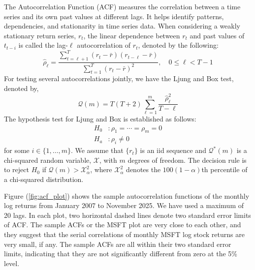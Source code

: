 \documentclass[12pt]{article}
\begin{document}
The Autocorrelation Function (ACF) measures the correlation between a time series and its own past values at different lags. It helps identify patterns, dependencies, and stationarity in time series data. When considering a weakly stationary return series, $r_t$, the linear dependence between $r_t$ and past values of $t_{t-i}$ is called the lag-$\ell$ autocorrelation of $r_t$, denoted by the following:
\begin{equation}
	\hat{\rho}_\ell=\frac{\sum_{t=\ell+1}^{T}\left(r_t-\bar{r}\right)\left(r_{t-\ell}-\bar{r}\right)}{\sum_{t=1}^{T}\left(r_t-\bar{r}\right)^2},\quad 0\leq\ell<T-1
\end{equation}
For testing several autocorrelations jointly, we have the Ljung and Box test, denoted by,
\begin{equation}
	\mathcal{Q}(m)=T(T+2)\sum_{\ell=1}^{m}\frac{\hat{\rho}_\ell^2}{T-\ell}
\end{equation}
The hypothesis test for Ljung and Box is established as follows:
\[
\begin{aligned}
	H_0&:\rho_1=\cdots=\rho_m=0\\
	H_a&:\rho_i\neq 0
\end{aligned}
\]
for some $i\in\lbrace1,\ldots,m\rbrace$. We assume that $\lbrace r_t\rbrace$ is an iid sequence and $\mathcal{Q}^*(m)$ is a chi-squared random variable, $\mathcal{X}$, with $m$ degrees of freedom. The decision rule is to reject $H_0$ if $\mathcal{Q}(m)>\mathcal{X}^2_\alpha$, where $\mathcal{X}^2_\alpha$ denotes the $100\left(1-\alpha\right)$th percentile of a chi-squared distribution. 

Figure (\ref{fig:acf_plot}) shows the sample autocorrelation functions of the monthly log returns from January 2007 to November 2025. We have used a maximum of 20 lags. In each plot, two horizontal dashed lines denote two standard error limits of ACF. The sample ACFs or the MSFT plot are very close to each other, and they suggest that the serial correlations of monthly MSFT log stock returns are very small, if any. The sample ACFs are all within their two standard error limits, indicating that they are not significantly different from zero at the 5\% level.
\end{document}
